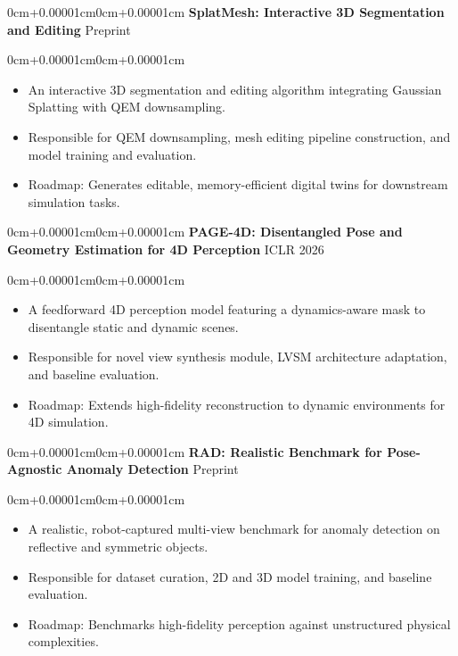 \documentclass[10pt, letterpaper]{article}
\newenvironment{highlights}{\begin{itemize}[topsep=0.10cm,parsep=0.10cm,partopsep=0pt,itemsep=0pt,leftmargin=0cm+10pt]}{\end{itemize}}
\newenvironment{onecolentry}{\begin{adjustwidth}{0cm+0.00001cm}{0cm+0.00001cm}}{\end{adjustwidth}}
\begin{document}
    \begin{onecolentry}
        \textbf{SplatMesh: Interactive 3D Segmentation and Editing} \hfill Preprint
    \end{onecolentry}
    \begin{onecolentry}
        \begin{highlights}
        \item An interactive 3D segmentation and editing algorithm integrating Gaussian Splatting with QEM downsampling.
        \item Responsible for QEM downsampling, mesh editing pipeline construction, and model training and evaluation.
        \item Roadmap: Generates editable, memory-efficient digital twins for downstream simulation tasks.\hspace{4pt}\cvdot
        \end{highlights}
    \end{onecolentry}

    \vspace{0.15cm}

    \begin{onecolentry}
        \textbf{PAGE-4D: Disentangled Pose and Geometry Estimation for 4D Perception} \hfill ICLR 2026
    \end{onecolentry}
    \begin{onecolentry}
        \begin{highlights}
        \item A feedforward 4D perception model featuring a dynamics-aware mask to disentangle static and dynamic scenes.
        \item Responsible for novel view synthesis module, LVSM architecture adaptation, and baseline evaluation.
        \item Roadmap: Extends high-fidelity reconstruction to dynamic environments for 4D simulation.\hspace{4pt}\cvdot
        \end{highlights}
    \end{onecolentry}

    \vspace{0.15cm}
    
    \begin{onecolentry}
        \textbf{RAD: Realistic Benchmark for Pose-Agnostic Anomaly Detection} 
        \hfill Preprint
    \end{onecolentry}
    \begin{onecolentry}
        \begin{highlights}
        \item A realistic, robot-captured multi-view benchmark for anomaly detection on reflective and symmetric objects.
        \item Responsible for dataset curation, 2D and 3D model training, and baseline evaluation.
        \item Roadmap: Benchmarks high-fidelity perception against unstructured physical complexities.\hspace{4pt}\cvdot\hspace{2.5pt}\robdot
        \end{highlights}
    \end{onecolentry}
\end{document}
